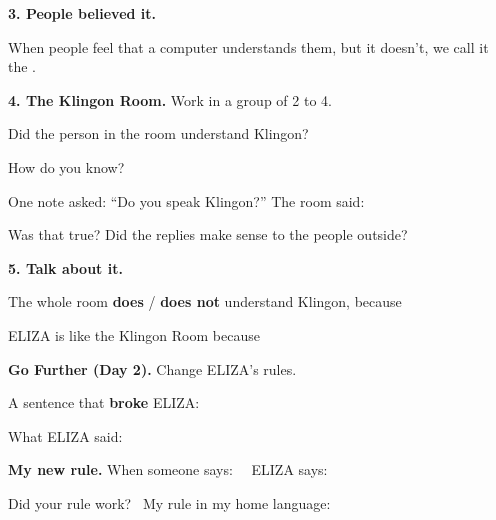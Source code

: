 \documentclass[11pt]{article}
\begin{document}
\newpage

{\large\textbf{3. People believed it.}}

\vspace{0.4em}
When people feel that a computer understands them, but it doesn't, we call it the .


\vspace{1.3em}
{\large\textbf{4. The Klingon Room.}} Work in a group of 2 to 4.

\vspace{0.5em}
Did the person in the room understand Klingon? 

\vspace{0.9em}
How do you know? 

\vspace{0.9em}
One note asked: ``Do you speak Klingon?'' The room said: 

\vspace{0.9em}
Was that true?  \quad Did the replies make sense to the people outside? 

\vspace{1.1em}
{\large\textbf{5. Talk about it.}}

\vspace{0.5em}
The whole room \textbf{does} / \textbf{does not} understand Klingon, because 

\vspace{0.9em}
\blank{6.9in}

\vspace{0.9em}
ELIZA is like the Klingon Room because 

\vspace{1.0em}
{\large\textbf{Go Further (Day 2).}} Change ELIZA's rules.

\vspace{0.5em}
A sentence that \textbf{broke} ELIZA: 

\vspace{0.6em}
What ELIZA said: 

\vspace{0.6em}
\textbf{My new rule.} When someone says:  \ \ ELIZA says: 

\vspace{0.6em}
Did your rule work? \ansline{1.0in}{} \quad \ELL\ My rule in my home language: 

\vfill
\cuthere
\noindent{}\hfill
{}
\end{document}
